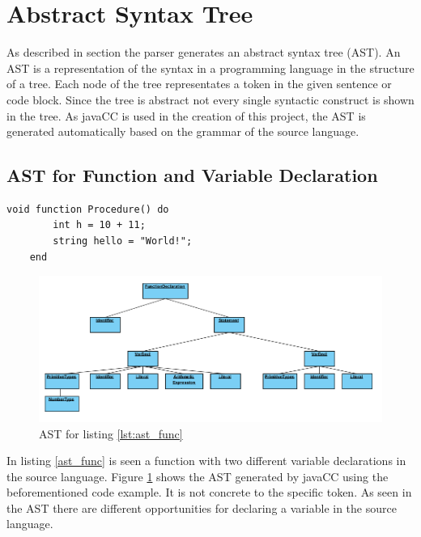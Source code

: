 \section{Abstract Syntax Tree}
As described in section  the parser generates an abstract syntax tree (AST). An AST is a representation of the syntax in a programming language in the structure of a tree. Each node of the tree representates a token in the given sentence or code block. Since the tree is abstract not every single syntactic construct is shown in the tree. As javaCC is used in the creation of this project, the AST is generated automatically based on the grammar of the source language.

\subsection{AST for Function and Variable Declaration}
\begin{lstlisting}[caption=Function with variable declaration, label=lst:ast_func]
	void function Procedure() do
		int h = 10 + 11;
		string hello = "World!";
	end
\end{lstlisting}
\begin{figure}[H]
	\centering
		\includegraphics[width=\textwidth]{billeder/function_AST.png}
		\caption{AST for listing \ref{lst:ast_func}}
		\label{fig:ast_func}
\end{figure}
In listing \ref{ast_func} is seen a function with two different variable declarations in the source language. Figure \ref{fig:ast_func} shows the AST generated by javaCC using the beforementioned code example. It is not concrete to the specific token. As seen in the AST there are different opportunities for declaring a variable in the source language.

